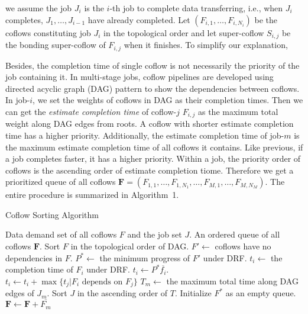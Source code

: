 \documentclass[10pt, conference, letterpaper]{IEEEtran}
\begin{document}
we assume the job $J_i$ is the $i$-th job to complete data transferring, i.e., when $J_i$ completes, $J_1,\dots,J_{i-1}$ have already completed. Let $(F_{i,1},\dots,F_{i,N_i})$ be the coflows constituting job $J_i$ in the topological order and let super-coflow $S_{i,j}$ be the bonding super-coflow of $F_{i,j}$ when it finishes. To simplify our explanation, 

Besides, the completion time of single coflow is not necessarily the priority of the job containing it. In multi-stage jobs, coflow pipelines are developed using directed acyclic graph (DAG) pattern to show the dependencies between coflows. In job-$i$, we set the weights of coflows in DAG as their completion times. Then we can get the \emph{estimate completion time} of coflow-$j$ $F_{i,j}$ as the maximum total weight along DAG edges from roots. A coflow with shorter estimate completion time has a higher priority. Additionally, the estimate completion time of job-$m$ is the maximum estimate completion time of all coflows it contains. Like previous, if a job completes faster, it has a higher priority. Within a job, the priority order of coflows is the ascending order of estimate completion tiome. Therefore we get a prioritized queue of all coflows $\mathbf{F} = (F_{1,1},\dots,F_{1,N_1},\dots,F_{M,1},\dots,F_{M,N_M})$. The entire procedure is summarized in Algorithm~1.

\begin{algorithm}
	\caption{Coflow Sorting Algorithm}
	\begin{algorithmic}[1]
		\Require Data demand set of all coflows $F$ and the job set $J$.
		\Ensure An ordered queue of all coflows $\mathbf{F}$. 
		\State Sort $F$ in the topological order of DAG.
		\State $F' \gets $ coflows have no dependencies in $F$.
		\State $P^* \gets$ the minimum progress of $F'$ under DRF.
				\State $t_i \gets$ the completion time of $F_i$ under DRF.
			\Else
				\State $t_i \gets P^*\overline{f_i}$.
			\EndIf
				\State $t_i \gets t_i + \max{\{t_j|F_i \text{ depends on } F_j\}}$
			\EndIf
		\EndFor
		\State $T_m \gets$ the maximum total time along DAG edges of $J_m$.
		\State Sort $J$ in the ascending order of $T$.
		\State Initialize $F^*$ as an empty queue.
			\State $\mathbf{F} \gets \mathbf{F} + \overline{F_m}$
		\EndFor
	\end{algorithmic}
\end{algorithm}
\end{document}
